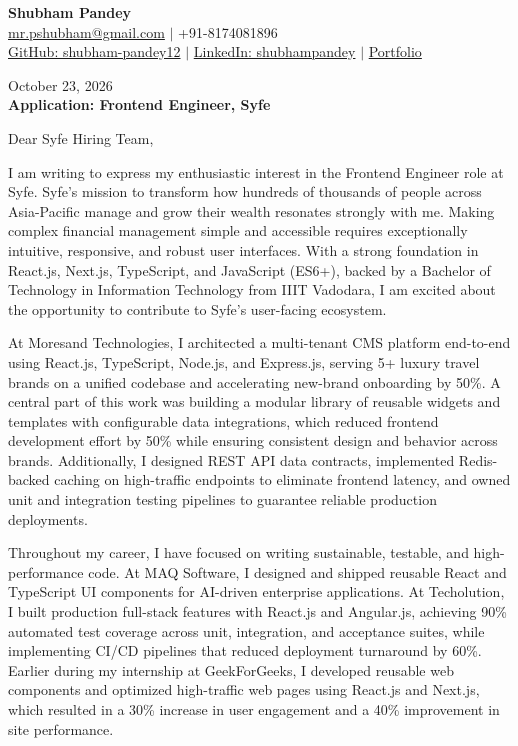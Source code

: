 \documentclass[a4paper,10pt]{article}
\begin{document}
\begin{center}
{\LARGE\textbf{Shubham Pandey}}\\[4pt]
\href{mailto:mr.pshubham@gmail.com}{mr.pshubham@gmail.com} $|$ +91-8174081896\\[2pt]
\href{https://github.com/shubham-pandey12}{GitHub: shubham-pandey12} $|$
\href{https://www.linkedin.com/in/shubham-pandey-a74716199/}{LinkedIn: shubhampandey} $|$
\href{https://shubham-portfolio-mocha.vercel.app/}{Portfolio}
\end{center}

October 23, 2026\\[4pt]
\textbf{Application: Frontend Engineer, Syfe}

\vspace{12pt}
Dear Syfe Hiring Team,

\vspace{8pt}
I am writing to express my enthusiastic interest in the Frontend Engineer role at Syfe. Syfe's mission to transform how hundreds of thousands of people across Asia-Pacific manage and grow their wealth resonates strongly with me. Making complex financial management simple and accessible requires exceptionally intuitive, responsive, and robust user interfaces. With a strong foundation in React.js, Next.js, TypeScript, and JavaScript (ES6+), backed by a Bachelor of Technology in Information Technology from IIIT Vadodara, I am excited about the opportunity to contribute to Syfe's user-facing ecosystem.

\vspace{8pt}
At Moresand Technologies, I architected a multi-tenant CMS platform end-to-end using React.js, TypeScript, Node.js, and Express.js, serving 5+ luxury travel brands on a unified codebase and accelerating new-brand onboarding by 50\%. A central part of this work was building a modular library of reusable widgets and templates with configurable data integrations, which reduced frontend development effort by 50\% while ensuring consistent design and behavior across brands. Additionally, I designed REST API data contracts, implemented Redis-backed caching on high-traffic endpoints to eliminate frontend latency, and owned unit and integration testing pipelines to guarantee reliable production deployments.

\vspace{8pt}
Throughout my career, I have focused on writing sustainable, testable, and high-performance code. At MAQ Software, I designed and shipped reusable React and TypeScript UI components for AI-driven enterprise applications. At Techolution, I built production full-stack features with React.js and Angular.js, achieving 90\% automated test coverage across unit, integration, and acceptance suites, while implementing CI/CD pipelines that reduced deployment turnaround by 60\%. Earlier during my internship at GeekForGeeks, I developed reusable web components and optimized high-traffic web pages using React.js and Next.js, which resulted in a 30\% increase in user engagement and a 40\% improvement in site performance.
\end{document}
